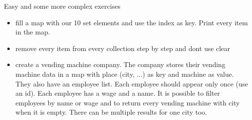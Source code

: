 \begin{frame}{Easy and some more complex exercises}
	\begin{itemize}
		\item fill a map with our 10 set elements and use the index as key. Print every item in the map.
		\item remove every item from every collection step by step and dont use clear
		\item create a vending machine company. The company stores their vending machine data in a map with place (city, ...) as key and machine as value. They also have an employee list. Each employee should appear only once (use an id). Each employee has a wage and a name. It is possible to filter employees by name or wage and to return every vending machine with city when it is empty. There can be multiple results for one city too.
	\end{itemize}
	
\end{frame}



